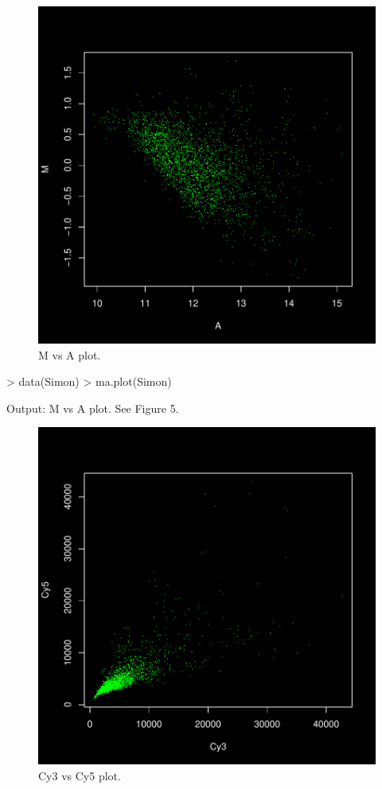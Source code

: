 \documentclass[12pt]{article}
\begin{document}
\begin{figure}[h]
\begin{center}
\includegraphics{example-genArise-007}
\caption{M vs A plot. \label{fig5}}
\end{center}
\end{figure}
\begin{Scode}
> data(Simon)
> ma.plot(Simon)
\end{Scode}
\begin{Soutput}
Output: M vs A plot. See Figure 5.
\end{Soutput}
\begin{figure}[h]
\begin{center}
\includegraphics{example-genArise-008}
\caption{Cy3 vs Cy5 plot. \label{fig6}}
\end{center}
\end{figure}
\end{document}
